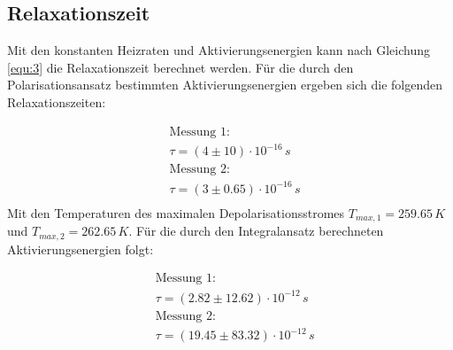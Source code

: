 \subsection{Relaxationszeit}
\label{sec:rel}
Mit den konstanten Heizraten und Aktivierungsenergien kann nach Gleichung \ref{equ:3} die Relaxationszeit berechnet werden.
Für die durch den Polarisationsansatz bestimmten Aktivierungsenergien ergeben sich die folgenden Relaxationszeiten: 

\begin{align*}
    &\text{Messung 1:}\\
    & \tau = (4 \pm 10) \cdot 10^{-16} \,s    \\
    &\text{Messung 2:}\\
    & \tau = (3 \pm 0.65) \cdot 10^{-16} \,s  \\
\end{align*}
Mit den Temperaturen des maximalen Depolarisationsstromes $T_{max,1} = 259.65 \,K $ und $T_{max,2} = 262.65 \,K $.
Für die durch den Integralansatz berechneten Aktivierungsenergien folgt:

\begin{align*}
    &\text{Messung 1:}\\
    & \tau = (2.82 \pm 12.62) \cdot 10^{-12} \,s    \\
    &\text{Messung 2:}\\
    & \tau = (19.45 \pm 83.32) \cdot 10^{-12} \,s  \\
\end{align*}



